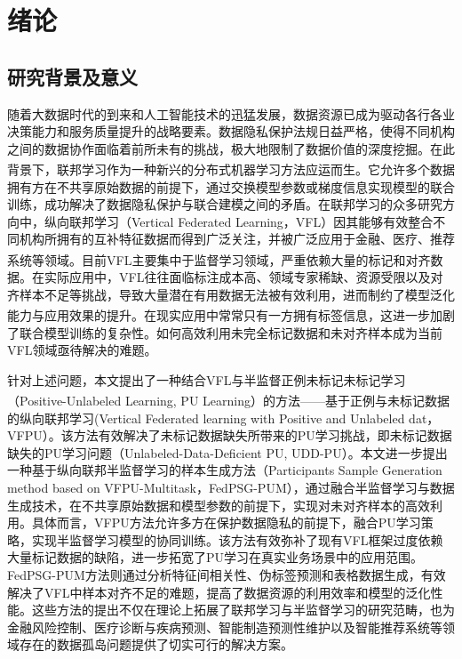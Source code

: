 \chapter{绪论} 
\thispagestyle{others} 
\pagestyle{others} 
\xiaosi 

\section{研究背景及意义}
随着大数据时代的到来和人工智能技术的迅猛发展，数据资源已成为驱动各行各业决策能力和服务质量提升的战略要素。数据隐私保护法规日益严格，使得不同机构之间的数据协作面临着前所未有的挑战，极大地限制了数据价值的深度挖掘。在此背景下，联邦学习\textsuperscript{\cite{chen2021secureboost+,de2010practical}}作为一种新兴的分布式机器学习方法应运而生。它允许多个数据拥有方在不共享原始数据的前提下，通过交换模型参数或梯度信息实现模型的联合训练，成功解决了数据隐私保护与联合建模之间的矛盾。在联邦学习的众多研究方向中，纵向联邦学习（Vertical Federated Learning，VFL）因其能够有效整合不同机构所拥有的互补特征数据而得到广泛关注，并被广泛应用于金融、医疗、推荐系统等领域\textsuperscript{\cite{liu2020secure,chen2020vafl}}。目前VFL主要集中于监督学习领域，严重依赖大量的标记和对齐数据。在实际应用中，VFL往往面临标注成本高、领域专家稀缺、资源受限以及对齐样本不足等挑战，导致大量潜在有用数据无法被有效利用，进而制约了模型泛化能力与应用效果的提升\textsuperscript{\cite{li2021comatch}}。在现实应用中常常只有一方拥有标签信息，这进一步加剧了联合模型训练的复杂性。如何高效利用未完全标记数据和未对齐样本成为当前VFL领域亟待解决的难题。

针对上述问题，本文提出了一种结合VFL与半监督正例未标记未标记学习（Positive-Unlabeled Learning, PU Learning）\textsuperscript{\cite{pulearn}}的方法——基于正例与未标记数据的纵向联邦学习(Vertical Federated learning with Positive and Unlabeled dat，VFPU）。该方法有效解决了未标记数据缺失所带来的PU学习挑战，即未标记数据缺失的PU学习问题（Unlabeled-Data-Deficient PU, UDD-PU）。本文进一步提出一种基于纵向联邦半监督学习的样本生成方法（Participants Sample Generation method based on VFPU-Multitask，FedPSG-PUM），通过融合半监督学习与数据生成技术，在不共享原始数据和模型参数的前提下，实现对未对齐样本的高效利用。具体而言，VFPU方法允许多方在保护数据隐私的前提下，融合PU学习策略，实现半监督学习模型的协同训练。该方法有效弥补了现有VFL框架过度依赖大量标记数据的缺陷，进一步拓宽了PU学习在真实业务场景中的应用范围。FedPSG-PUM方法则通过分析特征间相关性、伪标签预测和表格数据生成，有效解决了VFL中样本对齐不足的难题，提高了数据资源的利用效率和模型的泛化性能。这些方法的提出不仅在理论上拓展了联邦学习与半监督学习的研究范畴，也为金融风险控制、医疗诊断与疾病预测、智能制造预测性维护以及智能推荐系统等领域存在的数据孤岛问题提供了切实可行的解决方案。

